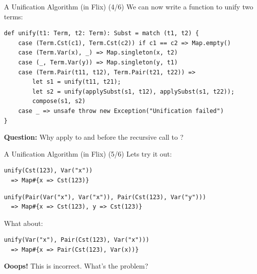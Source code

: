 \begin{frame}[fragile]{A Unification Algorithm (in Flix) (4/6)}
We can now write a function to unify two terms:

\begin{lstlisting}[language=flix, xleftmargin=0.5cm]
def unify(t1: Term, t2: Term): Subst = match (t1, t2) {
    case (Term.Cst(c1), Term.Cst(c2)) if c1 == c2 => Map.empty()
    case (Term.Var(x), _) => Map.singleton(x, t2)
    case (_, Term.Var(y)) => Map.singleton(y, t1)
    case (Term.Pair(t11, t12), Term.Pair(t21, t22)) => 
        let s1 = unify(t11, t21);
        let s2 = unify(applySubst(s1, t12), applySubst(s1, t22));
        compose(s1, s2)
    case _ => unsafe throw new Exception("Unification failed")
}
\end{lstlisting}

\pause

\textbf{Question:} Why apply  to  and  before the
recursive call to ?
\end{frame}  

\begin{frame}[fragile]{A Unification Algorithm (in Flix) (5/6)}
Lets try it out: 

\begin{lstlisting}[language=flix, xleftmargin=0.5cm]
unify(Cst(123), Var("x")) 
  => Map#{x => Cst(123)}
\end{lstlisting}

\pause 

\begin{lstlisting}[language=flix, xleftmargin=0.5cm]
unify(Pair(Var("x"), Var("x")), Pair(Cst(123), Var("y"))) 
  => Map#{x => Cst(123), y => Cst(123)}
\end{lstlisting}

\pause 

What about:

\begin{lstlisting}[language=flix, xleftmargin=0.5cm]
unify(Var("x"), Pair(Cst(123), Var("x")))
  => Map#{x => Pair(Cst(123), Var(x))}
\end{lstlisting}

\pause 

\textbf{Ooops!} This is incorrect. What's the problem?

\end{frame}

